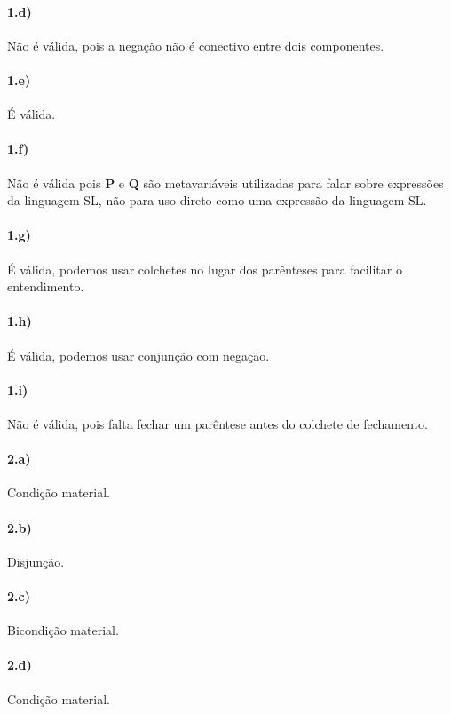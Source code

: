 \documentclass[pdftex,a4paper,12pt,brazil]{article} %
\begin{document}
\paragraph{1.d)} Não é válida, pois a negação não é conectivo entre dois componentes.

\paragraph{1.e)} É válida.

\paragraph{1.f)} Não é válida pois \textbf{P} e \textbf{Q} são metavariáveis utilizadas
para falar sobre expressões da linguagem SL, não para uso direto como uma expressão
da linguagem SL.

\paragraph{1.g)} É válida, podemos usar colchetes no lugar dos parênteses para
facilitar o entendimento.

\paragraph{1.h)} É válida, podemos usar conjunção com negação.

\paragraph{1.i)} Não é válida, pois falta fechar um parêntese antes do colchete
de fechamento.

\paragraph{2.a)} Condição material.

\paragraph{2.b)} Disjunção.

\paragraph{2.c)} Bicondição material.

\paragraph{2.d)} Condição material.
\end{document}
